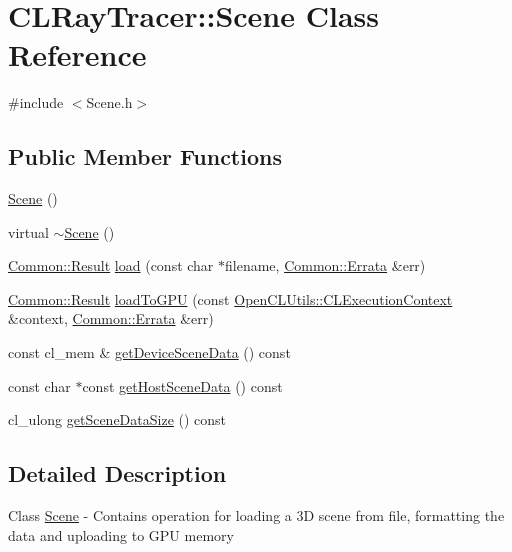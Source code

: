 \hypertarget{class_c_l_ray_tracer_1_1_scene}{}\section{C\+L\+Ray\+Tracer\+:\+:Scene Class Reference}
\label{class_c_l_ray_tracer_1_1_scene}


{\ttfamily \#include $<$Scene.\+h$>$}

\subsection*{Public Member Functions}
\begin{DoxyCompactItemize}
\item 
\hyperlink{class_c_l_ray_tracer_1_1_scene_a89b9159336331ea6c675c7864ed3c888}{Scene} ()
\item 
virtual \hyperlink{class_c_l_ray_tracer_1_1_scene_aa871fdaa2b3880416e5c502392a7e964}{$\sim$\+Scene} ()
\item 
\hyperlink{_errata_8h_a389396702f1aff6e71eb21328b0775c1}{Common\+::\+Result} \hyperlink{class_c_l_ray_tracer_1_1_scene_a60570e67d059a4f003994b481a5643b9}{load} (const char $\ast$filename, \hyperlink{class_c_l_ray_tracer_1_1_common_1_1_errata}{Common\+::\+Errata} \&err)
\item 
\hyperlink{_errata_8h_a389396702f1aff6e71eb21328b0775c1}{Common\+::\+Result} \hyperlink{class_c_l_ray_tracer_1_1_scene_ae7a6da6258542c4bcd4d456e3bd12c67}{load\+To\+G\+PU} (const \hyperlink{class_c_l_ray_tracer_1_1_open_c_l_utils_1_1_c_l_execution_context}{Open\+C\+L\+Utils\+::\+C\+L\+Execution\+Context} \&context, \hyperlink{class_c_l_ray_tracer_1_1_common_1_1_errata}{Common\+::\+Errata} \&err)
\item 
const cl\+\_\+mem \& \hyperlink{class_c_l_ray_tracer_1_1_scene_ac45c15ae0972741cc364cbb6f816ba75}{get\+Device\+Scene\+Data} () const 
\item 
const char $\ast$const \hyperlink{class_c_l_ray_tracer_1_1_scene_a5de09da0e638e6a309b3cf36da570b48}{get\+Host\+Scene\+Data} () const 
\item 
cl\+\_\+ulong \hyperlink{class_c_l_ray_tracer_1_1_scene_a6ac5b3cba63cee7d19245d35d1aebb80}{get\+Scene\+Data\+Size} () const 
\end{DoxyCompactItemize}


\subsection{Detailed Description}
Class \hyperlink{class_c_l_ray_tracer_1_1_scene}{Scene} -\/ Contains operation for loading a 3D scene from file, formatting the data and uploading to G\+PU memory 

